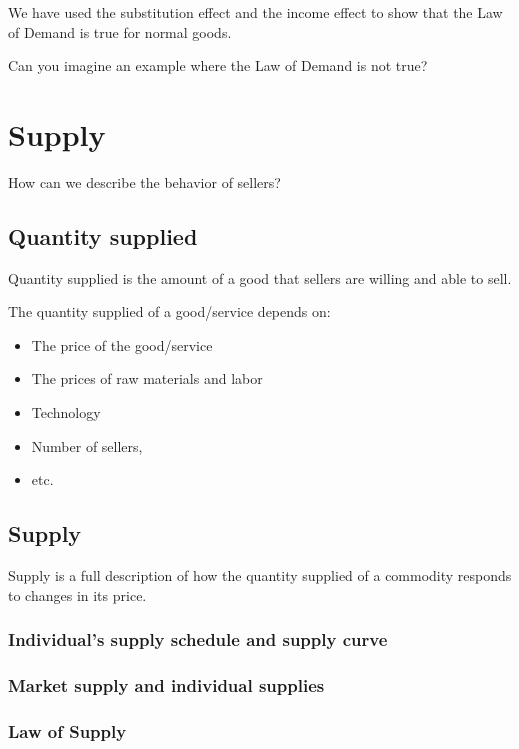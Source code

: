 \documentclass[
  letterpaper,
]{book}
\providecommand{\tightlist}{%
  \setlength{\itemsep}{0pt}\setlength{\parskip}{0pt}}\usepackage{longtable,booktabs,array}
\begin{document}
We have used the substitution effect and the income effect to show that
the Law of Demand is true for normal goods.

Can you imagine an example where the Law of Demand is not true?

\section{Supply}\label{supply}

How can we describe the behavior of sellers?

\subsection{Quantity supplied}\label{quantity-supplied}

Quantity supplied is the amount of a good that sellers are willing and
able to sell.

The quantity supplied of a good/service depends on:

\begin{itemize}
\tightlist
\item
  The price of the good/service
\item
  The prices of raw materials and labor
\item
  Technology
\item
  Number of sellers,
\item
  etc.
\end{itemize}

\subsection{Supply}\label{supply-1}

Supply is a full description of how the quantity supplied of a commodity
responds to changes in its price.

\subsubsection{Individual's supply schedule and supply
curve}\label{individuals-supply-schedule-and-supply-curve}

\subsubsection{Market supply and individual
supplies}\label{market-supply-and-individual-supplies}

\subsubsection{Law of Supply}\label{law-of-supply}
\end{document}
